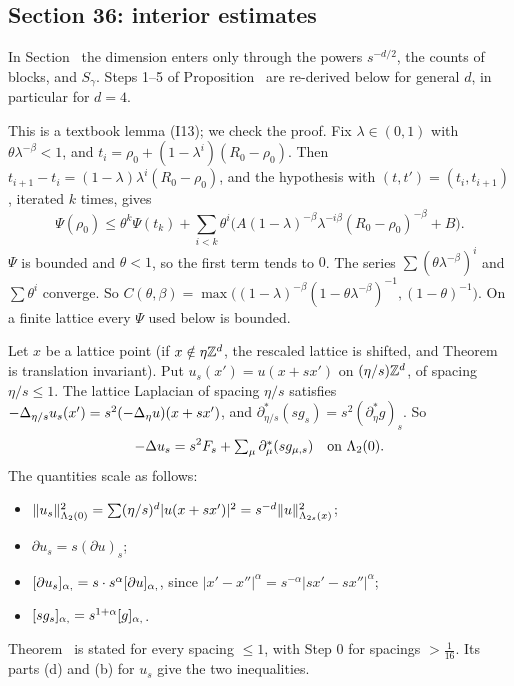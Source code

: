 \subsection{Section 36: interior estimates}\label{d8:s36}

In Section~ the dimension enters only through the powers $s^{-d/2}$, the counts of blocks, and $S_\gamma$. Steps 1--5 of Proposition~ are re-derived below for general $d$, in particular for $d=4$.

\begin{detail}\label{d8:iteration}
This is a textbook lemma (I13); we check the proof. Fix $\lambda\in(0,1)$ with $\theta\lambda^{-\beta}<1$, and $t_i=\rho_0+(1-\lambda^i)(R_0-\rho_0)$. Then $t_{i+1}-t_i=(1-\lambda)\lambda^i(R_0-\rho_0)$, and the hypothesis with $(t,t')=(t_i,t_{i+1})$, iterated $k$ times, gives
\[
\Psi(\rho_0)\le\theta^k\Psi(t_k)+\sum_{i<k}\theta^i\big(A(1-\lambda)^{-\beta}\lambda^{-i\beta}(R_0-\rho_0)^{-\beta}+B\big).
\]
$\Psi$ is bounded and $\theta<1$, so the first term tends to $0$. The series $\sum(\theta\lambda^{-\beta})^i$ and $\sum\theta^i$ converge. So $C(\theta,\beta)=\max\big((1-\lambda)^{-\beta}(1-\theta\lambda^{-\beta})^{-1},(1-\theta)^{-1}\big)$. On a finite lattice every $\Psi$ used below is bounded.
\end{detail}

\begin{detail}\label{d8:rescaled}
Let $x$ be a lattice point (if $x\notin\eta\mathbb Z^d$, the rescaled lattice is shifted, and Theorem~ is translation invariant). Put $u_s(x')=u(x+sx')$ on $(\eta/s)\mathbb Z^d$, of spacing $\eta/s\le1$. The lattice Laplacian of spacing $\eta/s$ satisfies $-\Delta_{\eta/s}u_s(x')=s^2(-\Delta_\eta u)(x+sx')$, and $\partial^*_{\eta/s}(sg_s)=s^2(\partial^*_\eta g)_s$. So
\[
-\Delta u_s=s^2F_s+\textstyle\sum_\mu\partial^*_\mu(sg_{\mu,s})\quad\text{on }\Lambda_2(0).
\]
The quantities scale as follows:
\begin{itemize}
\item $\|u_s\|^2_{\Lambda_2(0)}=\sum(\eta/s)^d|u(x+sx')|^2=s^{-d}\|u\|^2_{\Lambda_{2s}(x)}$;
\item $\partial u_s=s(\partial u)_s$;
\item $[\partial u_s]_{\alpha,}=s\cdot s^\alpha[\partial u]_{\alpha,}$, since $|x'-x''|^\alpha=s^{-\alpha}|sx'-sx''|^\alpha$;
\item $[sg_s]_{\alpha,}=s^{1+\alpha}[g]_{\alpha,}$.
\end{itemize}
Theorem~ is stated for every spacing $\le1$, with Step 0 for spacings $>\frac1{16}$. Its parts (d) and (b) for $u_s$ give the two inequalities.
\end{detail}

